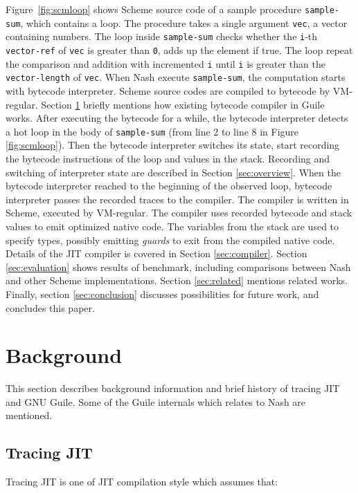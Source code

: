 \documentclass[preprint, numbers]{sigplanconf}
\begin{document}
Figure~\hyperref[fig:scmloop]{\ref{fig:scmloop}} shows Scheme source code of a
sample procedure \texttt{sample-sum}, which contains a loop. The procedure
takes a single argument \texttt{vec}, a vector containing numbers. The loop
inside \texttt{sample-sum} checks whether the \texttt{i}-th
\texttt{vector-ref} of \texttt{vec} is greater than \texttt{0}, adds up the
element if true. The loop repeat the comparison and addition with incremented
\texttt{i} until \texttt{i} is greater than the \texttt{vector-length} of
\texttt{vec}.  When Nash execute \texttt{sample-sum}, the computation starts
with bytecode interpreter. Scheme source codes are compiled to bytecode by
VM-regular. Section \hyperref[sec:background]{\ref{sec:background}} briefly
mentions how existing bytecode compiler in Guile works. After executing the
bytecode for a while, the bytecode interpreter detects a hot loop in the body
of \texttt{sample-sum} (from line 2 to line 8 in Figure~
\hyperref[fig:scmloop]{\ref{fig:scmloop}}). Then the bytecode interpreter
switches its state, start recording the bytecode instructions of the loop and
values in the stack. Recording and switching of interpreter state are
described in Section \hyperref[sec:overview]{\ref{sec:overview}}. When the
bytecode interpreter reached to the beginning of the observed loop, bytecode
interpreter passes the recorded traces to the compiler. The compiler is
written in Scheme, executed by VM-regular. The compiler uses recorded bytecode
and stack values to emit optimized native code. The variables from the stack
are used to specify types, possibly emitting \textit{guards} to exit from the
compiled native code. Details of the JIT compiler is covered in Section
\hyperref[sec:compiler]{\ref{sec:compiler}}. Section
\hyperref[sec:evaluation]{\ref{sec:evaluation}} shows results of benchmark,
including comparisons between Nash and other Scheme implementations. Section
\hyperref[sec:related]{\ref{sec:related}} mentions related works. Finally,
section \hyperref[sec:conclusion]{\ref{sec:conclusion}} discusses
possibilities for future work, and concludes this paper.

\section{Background}
\label{sec:background}

This section describes background information and brief history of tracing JIT
and GNU Guile. Some of the Guile internals which relates to Nash are
mentioned.

\subsection{Tracing JIT}
Tracing JIT is one of JIT compilation style which assumes
that\cite{bolz2009tracing}:
\end{document}

